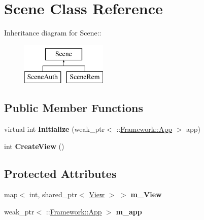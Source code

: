 \hypertarget{classScene}{
\section{Scene Class Reference}
\label{classScene}
}
Inheritance diagram for Scene::\begin{figure}[H]
\begin{center}
\leavevmode
\includegraphics[height=2cm]{classScene}
\end{center}
\end{figure}
\subsection*{Public Member Functions}
\begin{DoxyCompactItemize}
\item 
\hypertarget{classScene_ac5c66048b6684911ef93360a6416ed19}{
virtual int {\bfseries Initialize} (weak\_\-ptr$<$ ::\hyperlink{classFramework_1_1App}{Framework::App} $>$ app)}
\label{classScene_ac5c66048b6684911ef93360a6416ed19}

\item 
\hypertarget{classScene_ae108d4726b6db49ea6b34b7a366c423b}{
int {\bfseries CreateView} ()}
\label{classScene_ae108d4726b6db49ea6b34b7a366c423b}

\end{DoxyCompactItemize}
\subsection*{Protected Attributes}
\begin{DoxyCompactItemize}
\item 
\hypertarget{classScene_ac6bd6a6e1c829b5c1ababc79a467324d}{
map$<$ int, shared\_\-ptr$<$ \hyperlink{classView}{View} $>$ $>$ {\bfseries m\_\-View}}
\label{classScene_ac6bd6a6e1c829b5c1ababc79a467324d}

\item 
\hypertarget{classScene_aaf1a587311f66245db10873db4816b15}{
weak\_\-ptr$<$ ::\hyperlink{classFramework_1_1App}{Framework::App} $>$ {\bfseries m\_\-app}}
\label{classScene_aaf1a587311f66245db10873db4816b15}

\end{DoxyCompactItemize}
